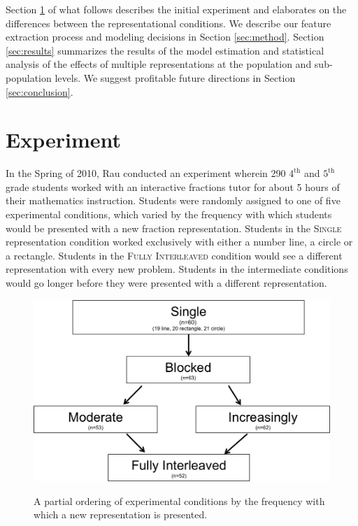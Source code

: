 \documentclass{edm_template}
\newcommand{\mgr}[1]{\textsc{#1}}
\begin{document}
Section \ref{sec:experiment} of what follows describes the initial experiment and elaborates on the differences between the representational conditions. We describe our feature extraction process and modeling decisions in Section \ref{sec:method}. Section \ref{sec:results} summarizes the results of the model estimation and statistical analysis of the effects of multiple representations at the population and sub-population levels. We  suggest profitable future directions in Section \ref{sec:conclusion}.

\section{Experiment}
\label{sec:experiment}

In the Spring of 2010, Rau conducted an experiment wherein 290 $4^\text{th}$ and $5^\text{th}$ grade students worked with an interactive fractions tutor for about 5 hours of their mathematics instruction. Students were randomly assigned to one of five experimental conditions, which varied by the frequency with which students would be presented with a new fraction representation. Students in the \mgr{Single} representation condition worked exclusively with either a number line, a circle or a rectangle. Students in the \mgr{Fully Interleaved} condition would see a different representation with every new problem. Students in the intermediate conditions would go longer before they were presented with a different representation.   
\begin{figure}[htbp]
\centering
\includegraphics[scale=.4]{conditionGraph.png}\\
\caption{A partial ordering of experimental conditions by the frequency with which a new representation is presented. }
\label{fig:condition-graph}
\end{figure}
\end{document}
